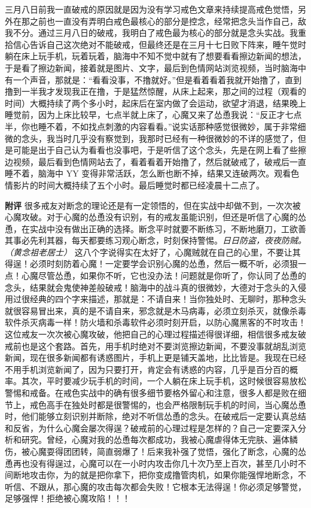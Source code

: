 \begin{case}
    三月八日前我一直破戒的原因就是因为没有学习戒色文章来持续提高戒色觉悟，另外在那之前也一直没有弄明白戒色最核心的部分是控念，经常把念头当作自己，敌我不分。通过三月八日的破戒，我明白了戒色最为核心的部分就是念头实战。我重拾信心告诉自己这次绝对不能破戒，但最终还是在三月十七日败下阵来，睡午觉时躺在床上玩手机，玩着玩着，脑海中不知不觉中就有了想要看看擦边新闻的想法，于是看了擦边新闻，接着就是图片、文字，最后到色情网站浏览视频，当时脑海中有一个声音，那就是：“看看没事，不撸就好。”但是看着看着我就开始撸了，直到撸到一半我才发现我正在撸，于是猛然惊醒，从床上起来，那之间的过程（观看的时间）大概持续了两个多小时，起床后在室内做了会运动，欲望才消退，结果晚上睡觉前，因为上床比较早，七点半就上床了，心魔又来了怂恿我说：“反正才七点半，你也睡不着，不如找点刺激的内容看看。”说实话那种感觉很微妙，属于非常细微的念头，我当时几乎没有察觉到，我那时已经有一种很微妙的不详的感觉了，但是可能是出于自己认为看看也没事吧，于是听信了这个念头，先是在网上看了些擦边视频，最后看到色情网站去了，看着看着开始撸了，然后就破戒了，破戒后一直睡不着，脑海中 YY 变得非常活跃，怎么断也断不掉，结果又连破两次。观看色情影片的时间大概持续了五个小时。最后睡觉时都已经凌晨十二点了。

    \textbf{附评} 很多戒友对断念的理论还是有一定领悟的，但在实战中却做不到，一次次被心魔攻破。对于心魔的怂恿没有识别，有的戒友虽能识别，但还是听信了心魔的怂恿，在实战中没有做出正确的选择。断念平时就要不断练习，不断地磨刀，工欲善其事必先利其器，每天都要练习观心断念，时刻保持警惕。\textit{日日防盗，夜夜防贼。（黄念祖老居士）} 这八个字说得实在太好了，心魔贼就在自己的心里，不要让其得逞！必须时刻防着心魔！一定要学会识别心魔的怂恿，然后一概不听，必须狠一点！心魔尽管怂恿，如果你不听，它也没办法！问题就是你听了，你认同了怂恿的念头，结果就会鬼使神差般破戒！脑海中的战斗真的很微妙，大德对于念头的入侵用过很经典的四个字来描述，那就是：不请自来！当你独处时、无聊时，那种念头就很容易冒出来，真的是不请自来，邪念就是木马病毒，必须立刻杀灭，就像杀毒软件杀灭病毒一样！防火墙和杀毒软件必须时刻开启，以防心魔黑客的不时攻击！这位戒友一次次被心魔攻破，他把自己的心理过程描述得很详细，相信很多戒友破戒前也是这个套路。首先，用手机时绝对不要浏览擦边新闻，不要没事就胡乱浏览新闻，现在很多新闻都有诱惑图片，手机上更是铺天盖地，比比皆是。我现在已经不用手机浏览新闻了，因为只要打开，肯定会有诱惑的内容，几乎是百分百的概率。其次，平时要减少玩手机的时间，一个人躺在床上玩手机，这时候很容易放松警惕和戒备。在戒色实战中的确有很多细节要格外留心和注意，很多人都是败在细节上，戒色高手在独处时都是很警惕的，也会严格限制玩手机的时间，当心魔怂恿时，他们能够立刻识别并断除，绝对不听信怂恿的念头。在破戒后一定要认真总结和反省，为什么心魔会屡次得逞？破戒前的心理过程是怎样的？自己一定要深入分析和研究。曾经，心魔对我的怂恿每次都成功，我被心魔虐得体无完肤、遍体鳞伤，被心魔耍得团团转，简直弱爆了！后来我补强了觉悟，强化了断念，心魔的怂恿再也没有得逞过，心魔可以在一小时内攻击你几十次乃至上百次，甚至几小时不间断地攻击你，为的就是把你拿下，把你变成撸管肉机，如果你能强悍地断念，不听信、不跟从，那心魔的攻击每次都会失败！它根本无法得逞！你必须足够警觉，足够强悍！拒绝被心魔攻陷！！！
\end{case}

